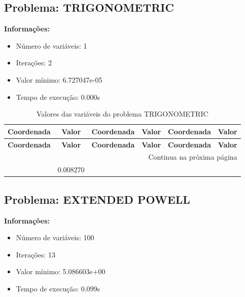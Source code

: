 \documentclass[12pt]{article}
\begin{document}
\newpage            
\subsection{Problema: TRIGONOMETRIC}

\textbf{Informações:}
\begin{itemize}
\item Número de variáveis: 1
\item Iterações: 2
\item Valor mínimo: 6.727047e-05
\item Tempo de execução: 0.000s
\end{itemize}

\small
\begin{longtable}{@{}cc|cc|cc@{}}
\caption{Valores das variáveis do problema TRIGONOMETRIC} \\
\toprule
\textbf{Coordenada} & \textbf{Valor} & \textbf{Coordenada} & \textbf{Valor} & \textbf{Coordenada} & \textbf{Valor} \\
\midrule
\endfirsthead

\toprule
\textbf{Coordenada} & \textbf{Valor} & \textbf{Coordenada} & \textbf{Valor} & \textbf{Coordenada} & \textbf{Valor} \\
\midrule
\endhead

\midrule \multicolumn{6}{r}{{Continua na próxima página}} \\ \midrule
\endfoot

\bottomrule
\endlastfoot
1 & 0.008270 &  &  &  &  \\

\end{longtable}


\newpage            
\subsection{Problema: EXTENDED POWELL}

\textbf{Informações:}
\begin{itemize}
\item Número de variáveis: 100
\item Iterações: 13
\item Valor mínimo: 5.086603e+00
\item Tempo de execução: 0.099s
\end{itemize}
\end{document}
